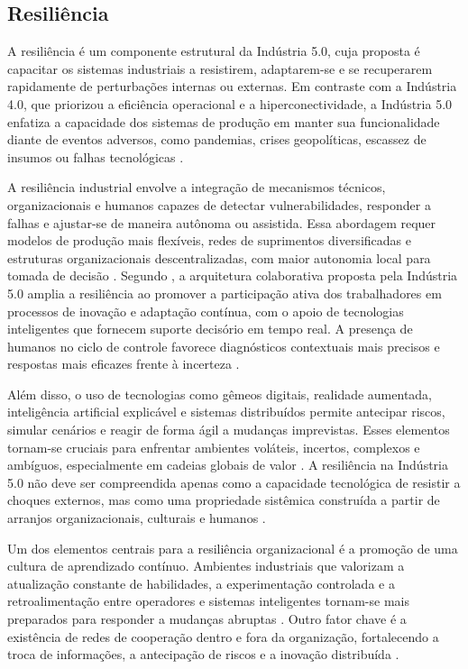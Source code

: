\subsection{Resiliência}

A resiliência é um componente estrutural da Indústria 5.0, cuja proposta é capacitar os sistemas industriais a resistirem, adaptarem-se e se recuperarem rapidamente de perturbações internas ou externas.
Em contraste com a Indústria 4.0, que priorizou a eficiência operacional e a hiperconectividade, a Indústria 5.0 enfatiza a capacidade dos sistemas de produção em manter sua funcionalidade diante de eventos adversos, como pandemias, crises geopolíticas, escassez de insumos ou falhas tecnológicas \cite{euCommission2021, VALETTE2023, Khan2023}.

A resiliência industrial envolve a integração de mecanismos técnicos, organizacionais e humanos capazes de detectar vulnerabilidades, responder a falhas e ajustar-se de maneira autônoma ou assistida.
Essa abordagem requer modelos de produção mais flexíveis, redes de suprimentos diversificadas e estruturas organizacionais descentralizadas, com maior autonomia local para tomada de decisão \cite{Santos2025, silva2024}.
Segundo , a arquitetura colaborativa proposta pela Indústria 5.0 amplia a resiliência ao promover a participação ativa dos trabalhadores em processos de inovação e adaptação contínua, com o apoio de tecnologias inteligentes que fornecem suporte decisório em tempo real.
A presença de humanos no ciclo de controle favorece diagnósticos contextuais mais precisos e respostas mais eficazes frente à incerteza \cite{TOTH2023}.

Além disso, o uso de tecnologias como gêmeos digitais, realidade aumentada, inteligência artificial explicável e sistemas distribuídos permite antecipar riscos, simular cenários e reagir de forma ágil a mudanças imprevistas.
Esses elementos tornam-se cruciais para enfrentar ambientes voláteis, incertos, complexos e ambíguos, especialmente em cadeias globais de valor \cite{VALETTE2023}.
A resiliência na Indústria 5.0 não deve ser compreendida apenas como a capacidade tecnológica de resistir a choques externos, mas como uma propriedade sistêmica construída a partir de arranjos organizacionais, culturais e humanos \cite{TOTH2023, Santos2025}.

Um dos elementos centrais para a resiliência organizacional é a promoção de uma cultura de aprendizado contínuo.
Ambientes industriais que valorizam a atualização constante de habilidades, a experimentação controlada e a retroalimentação entre operadores e sistemas inteligentes tornam-se mais preparados para responder a mudanças abruptas \cite{TOTH2023}.
Outro fator chave é a existência de redes de cooperação dentro e fora da organização, fortalecendo a troca de informações, a antecipação de riscos e a inovação distribuída \cite{VALETTE2023, Santana_2023}.

